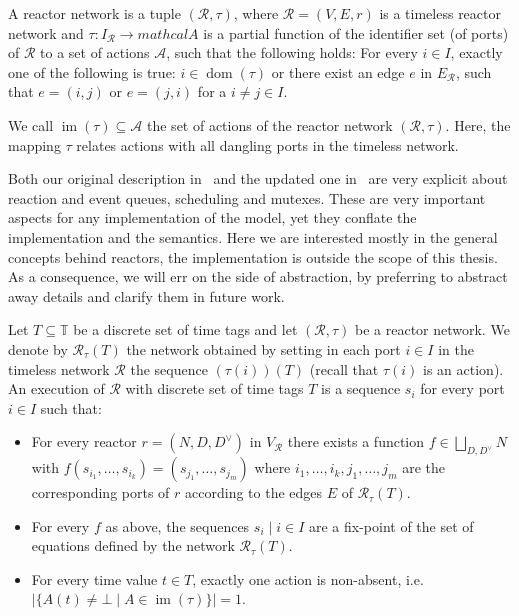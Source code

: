 \begin{defn}
    \label{defn:reactor_network}
    A reactor network is a tuple $(\mathcal{R},\tau)$, where $\mathcal{R} = (V,E,r)$ is a timeless reactor network and $\tau : I_\mathcal{R} \rightarrow mathcal{A}$ is a partial function of the identifier set (of ports) of $\mathcal{R}$ to a set of actions $\mathcal{A}$, such that the following holds:
    For every $i \in I$, exactly one of the following is true: $i \in \operatorname{dom}(\tau)$ or there exist an edge $e$ in $E_{\mathcal{R}}$, such that $e = (i,j)$ or $e = (j,i)$ for a $i \neq j \in I$.
\end{defn}

We call $\operatorname{im}(\tau) \subseteq \mathcal{A}$ the set of actions of the reactor network $(\mathcal{R},\tau)$.
Here, the mapping $\tau$ relates actions with all dangling ports in the timeless network.

Both our original description in~\cite{lohstroph_cyphy19} and the updated one in~\cite{lohstroh_phdthesis} are very explicit about reaction and event queues, scheduling and mutexes.
These are very important aspects for any implementation of the model, yet they conflate the implementation and the semantics.
Here we are interested mostly in the general concepts behind reactors, the implementation is outside the scope of this thesis.
As a consequence, we will err on the side of abstraction, by preferring to abstract away details and clarify them in future work. 

\begin{defn}
Let $T \subseteq \mathbb{T}$ be a discrete set of time tags and let $(\mathcal{R},\tau)$ be a reactor network.
We denote by $\mathcal{R}_\tau(T)$ the network obtained by setting in each port $i \in I$ in the timeless network $\mathcal{R}$ the sequence $(\tau(i))(T)$ (recall that $\tau(i)$ is an action).
An execution of $\mathcal{R}$ with discrete set of time tags $T$ is a sequence $s_i$ for every port $i \in I$ such that: 
\begin{itemize}
    \item For every reactor $r = (N,D,D^\vee)$ in $V_\mathcal{R}$ there exists a function $f \in \bigsqcup_{D,D^\vee}N$ with $f(s_{i_1},\ldots,s_{i_k}) = (s_{j_1},\ldots,s_{j_m})$ where $i_1,\ldots,i_k,j_1,\ldots,j_m$ are the corresponding ports of $r$ according to the edges $E$ of $\mathcal{R}_\tau(T)$.
    \item For every $f$ as above, the sequences ${s_i \mid i \in I}$ are a fix-point of the set of equations defined by the network $\mathcal{R}_\tau(T)$.
    \item For every time value $t \in T$, exactly one action is non-absent, i.e. $| \{ A(t) \neq \bot \mid A \in \operatorname{im}(\tau) \}| = 1$.
\end{itemize}
\end{defn}

